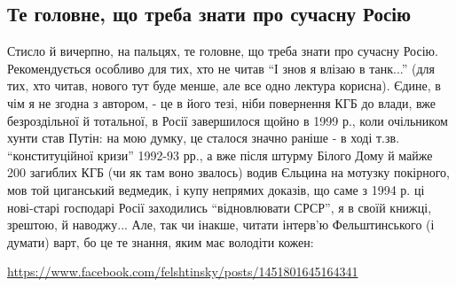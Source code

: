  
 
 
 
 

\subsection{Те головне, що треба знати про сучасну Росію}

Стисло й вичерпно, на пальцях, те головне, що треба знати про сучасну Росію.
Рекомендується особливо для тих, хто не читав \enquote{І знов я влізаю в танк...} (для
тих, хто читав, нового тут буде менше, але все одно лектура корисна). Єдине, в
чім я не згодна з автором, - це в його тезі, ніби повернення КГБ до влади, вже
безроздільної й тотальної, в Росії завершилося щойно в 1999 р., коли очільником
хунти став Путін: на мою думку, це сталося значно раніше - в ході т.зв.
\enquote{конституційної кризи} 1992-93 рр., а вже після штурму Білого Дому й майже 200
загиблих КГБ (чи як там воно звалось) водив Єльцина на мотузку покірного, мов
той циганський ведмедик, і купу непрямих доказів, що саме з 1994 р. ці
нові-старі господарі Росії заходились \enquote{відновлювати СРСР}, я в своїй книжці,
зрештою, й наводжу... Але, так чи інакше, читати інтерв'ю Фельштинського (і
думати) варт, бо це те знання, яким має володіти кожен:

\url{https://www.facebook.com/felshtinsky/posts/1451801645164341}
